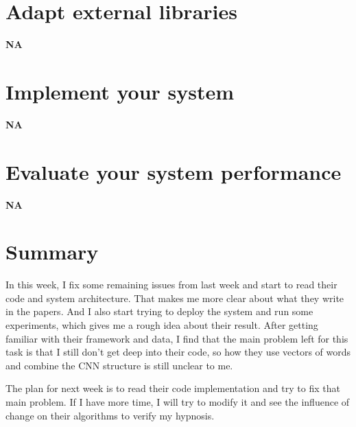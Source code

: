 \documentclass{article}
\begin{document}
\section{Adapt external libraries}
\textbf{NA}


\section{Implement your system}
\textbf{NA}


\section{Evaluate your system performance}
\textbf{NA}

\section{Summary}

In this week, I fix some remaining issues from last week and start to read their code and system architecture. That makes me more clear about what they write in the papers. And I also start trying to deploy the system and run some experiments, which gives me a rough idea about their result. After getting familiar with their framework and data, I find that the main problem left for this task is that I still don't get deep into their code, so how they use vectors of words and combine the CNN structure is still unclear to me. 

The plan for next week is to read their code implementation and try to fix that main problem. If I have more time, I will try to modify it and see the influence of change on their algorithms to verify my hypnosis.
\end{document}
